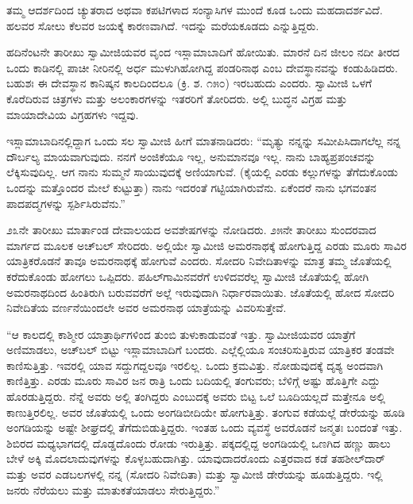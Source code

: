  ತಮ್ಮ ಆದರ್ಶದಿಂದ ಚ್ಯುತರಾದ ಅಥವಾ ಕಪಟಿಗಳಾದ ಸಂನ್ಯಾಸಿಗಳ ಮುಂದೆ ಕೂಡ ಒಂದು ಮಹದಾದರ್ಶವಿದೆ. ಹಲವರ ಸೋಲು ಕೆಲವರ ಜಯಕ್ಕೆ ಕಾರಣವಾಗಿದೆ. ಇದನ್ನು ಮರೆಯಕೂಡದು ಎನ್ನುತ್ತಿದ್ದರು. 

 ಹದಿನೆಂಟನೇ ತಾರೀಖು ಸ್ವಾಮೀಜಿಯವರ ವೃಂದ ಇಸ್ಲಾಮಾಬಾದಿಗೆ ಹೋಯಿತು. ಮಾರನೆ ದಿನ ಜೀಲಂ ನದೀ ತೀರದ ಒಂದು ಕಾಡಿನಲ್ಲಿ ಪಾಚೀ ನೀರಿನಲ್ಲಿ ಅರ್ಧ ಮುಳುಗಿಹೋಗಿದ್ದ ಪಂಡರಿನಾಥ ಎಂಬ ದೇವಸ್ಥಾನವನ್ನು ಕಂಡುಹಿಡಿದರು. ಬಹುಶಃ ಈ ದೇವಸ್ಥಾನ ಕಾನಿಷ್ಕನ ಕಾಲದಿಂದಲೂ (ಕ್ರಿ. ಶ. ೧೫೦) ಇರಬಹುದು ಎಂದರು. ಸ್ವಾಮೀಜಿ ಒಳಗೆ ಕೊರೆದಿರುವ ಚಿತ್ರಗಳು ಮತ್ತು ಅಲಂಕಾರಗಳನ್ನು ಇತರರಿಗೆ ತೋರಿದರು. ಅಲ್ಲಿ ಬುದ್ಧನ ವಿಗ್ರಹ ಮತ್ತು ಮಾಯಾದೇವಿಯ ವಿಗ್ರಹಗಳು ಇದ್ದವು. 

 ಇಸ್ಲಾಮಾಬಾದಿನಲ್ಲಿದ್ದಾಗ ಒಂದು ಸಲ ಸ್ವಾಮೀಜಿ ಹೀಗೆ ಮಾತನಾಡಿದರು: “ಮೃತ್ಯು ನನ್ನನ್ನು ಸಮೀಪಿಸಿದಾಗಲೆಲ್ಲ ನನ್ನ ದೌರ್ಬಲ್ಯ ಮಾಯವಾಗುವುದು. ನನಗೆ ಅಂಜಿಕೆಯೂ ಇಲ್ಲ, ಅನುಮಾನವೂ‌ ಇಲ್ಲ. ನಾನು ಬಾಹ್ಯಪ್ರಪಂಚವನ್ನು ಲೆಕ್ಕಿಸುವುದಿಲ್ಲ. ಆಗ ನಾನು ಸುಮ್ಮನೆ ಸಾಯುವುದಕ್ಕೆ ಅಣಿಯಾಗುವೆ. (ಕೈಯಲ್ಲಿ ಎರಡು ಕಲ್ಲುಗಳನ್ನು ತೆಗೆದುಕೊಂಡು ಒಂದನ್ನು ಮತ್ತೊಂದರ ಮೇಲೆ ಕುಟ್ಟುತ್ತಾ) ನಾನು ಇದರಂತೆ ಗಟ್ಟಿಯಾಗಿರುವೆನು. ಏಕೆಂದರೆ ನಾನು ಭಗವಂತನ ಪಾದಪದ್ಮಗಳನ್ನು ಸ್ಪರ್ಶಿಸಿರುವೆನು.” 

 ೨೩ನೇ ತಾರೀಖು ಮಾರ್ತಾಂಡ ದೇವಾಲಯದ ಅವಶೇಷಗಳನ್ನು ನೋಡಿದರು. ೨೫ನೇ ತಾರೀಖು ಸುಂದರವಾದ ಮಾರ್ಗದ ಮೂಲಕ ಅಚ್‍ಬಲ್ ಸೇರಿದರು. ಅಲ್ಲಿಯೇ ಸ್ವಾಮೀಜಿ ಅಮರನಾಥಕ್ಕೆ ಹೋಗುತ್ತಿದ್ದ ಎರಡು ಮೂರು ಸಾವಿರ ಯಾತ್ರಿಕರೊಡನೆ ತಾವೂ ಅಮರನಾಥಕ್ಕೆ ಹೋಗುವೆ ಎಂದರು. ಸೋದರಿ ನಿವೇದಿತಾಳನ್ನು ಮಾತ್ರ ತಮ್ಮ ಜೊತೆಯಲ್ಲಿ ಕರೆದುಕೊಂಡು ಹೋಗಲು ಒಪ್ಪಿದರು. ಪಹಿಲ್‍ಗಾಮಿನವರೆಗೆ ಉಳಿದವರೆಲ್ಲ ಸ್ವಾಮೀಜಿ ಜೊತೆಯಲ್ಲಿ ಹೋಗಿ ಅಮರನಾಥದಿಂದ ಹಿಂತಿರುಗಿ ಬರುವವರೆಗೆ ಅಲ್ಲೆ ಇರುವುದಾಗಿ ನಿರ್ಧಾರವಾಯಿತು. ಜೊತೆಯಲ್ಲಿ ಹೋದ ಸೋದರಿ ನಿವೇದಿತೆಯ ವರ್ಣನೆಯಿಂದಲೇ ಅವರ ಅಮರನಾಥ ಯಾತ್ರೆಯನ್ನು ವಿವರಿಸುತ್ತೇವೆ. 

 “ಆ ಕಾಲದಲ್ಲಿ ಕಾಶ್ಮೀರ ಯಾತ್ರಾರ್ಥಿಗಳಿಂದ ತುಂಬಿ ತುಳುಕಾಡುವಂತೆ ಇತ್ತು. ಸ್ವಾಮೀಜಿಯವರ ಯಾತ್ರೆಗೆ ಅಣಿಮಾಡಲು, ಅಚ್‍ಬಲ್ ಬಿಟ್ಟು ಇಸ್ಲಾಮಾಬಾದಿಗೆ ಬಂದರು. ಎಲ್ಲೆಲ್ಲಿಯೂ ಸಂಚರಿಸುತ್ತಿರುವ ಯಾತ್ರಿಕರ ತಂಡವೇ ಕಾಣಿಸುತ್ತಿತ್ತು. ಇವರಲ್ಲಿ ಯಾವ ಸದ್ದುಗದ್ದಲವೂ ಇರಲಿಲ್ಲ. ಒಂದು ಕ್ರಮವಿತ್ತು. ನೋಡುವುದಕ್ಕೆ ದೃಶ್ಯ ಅಂದವಾಗಿ ಕಾಣಿತ್ತಿತ್ತು. ಎರಡು ಮೂರು ಸಾವಿರ ಜನ ರಾತ್ರಿ ಒಂದು ಬದಿಯಲ್ಲಿ ತಂಗುವರು; ಬೆಳಿಗ್ಗೆ ಅಷ್ಟು ಹೊತ್ತಿಗೇ ಎದ್ದು ಹೊರಡುತ್ತಿದ್ದರು. ನೆನ್ನೆ ಅವರು ಅಲ್ಲಿ ತಂಗಿದ್ದರು ಎಂಬುದಕ್ಕೆ ಅವರು ಬಿಟ್ಟ ಒಲೆ ಬೂದಿಯಲ್ಲದೆ ಮತ್ತೇನೂ ಅಲ್ಲಿ ಕಾಣುತ್ತಿರಲಿಲ್ಲ. ಅವರ ಜೊತೆಯಲ್ಲಿ ಒಂದು ಅಂಗಡಿಬೀದಿಯೇ ಹೋಗುತ್ತಿತ್ತು. ತಂಗುವ ಕಡೆಯಲ್ಲೆ ಡೇರೆಯನ್ನು ಹೂಡಿ ಅಂಗಡಿಯನ್ನು ಅಷ್ಟೇ ಶೀಘ್ರದಲ್ಲಿ ತೆಗೆದುಬಿಡುತ್ತಿದ್ದರು. ಇಂತಹ ಒಂದು ವ್ಯವಸ್ಥೆ ಅವರೊಡನೆ ಜನ್ಮತಃ ಬಂದಂತೆ ಇತ್ತು. ಶಿಬಿರದ ಮಧ್ಯಭಾಗದಲ್ಲಿ ದೊಡ್ಡದೊಂದು ರೋಡು ಇರುತ್ತಿತ್ತು. ಪಕ್ಕದಲ್ಲಿದ್ದ ಅಂಗಡಿಯಲ್ಲಿ ಒಣಗಿದ ಹಣ್ಣು ಹಾಲು ಬೇಳೆ ಅಕ್ಕಿ ಮೊದಲಾದುವುಗಳನ್ನು ಕೊಳ್ಳಬಹುದಾಗಿತ್ತು. ಯಾವುದಾದರೊಂದು ಎತ್ತರವಾದ ಕಡೆ ತಹಶೀಲ್‍ದಾರ್ ಮತ್ತು ಅವರ ಎಡಬಲಗಳಲ್ಲಿ ನನ್ನ (ಸೋದರಿ ನಿವೇದಿತಾ) ಮತ್ತು ಸ್ವಾಮೀಜಿ ಡೇರೆಯನ್ನು ಹೂಡುತ್ತಿದ್ದರು. ಇಲ್ಲಿ ಜನರು ನೆರೆಯಲು ಮತ್ತು ಮಾತುಕತೆಯಾಡಲು ಸೇರುತ್ತಿದ್ದರು.” 

